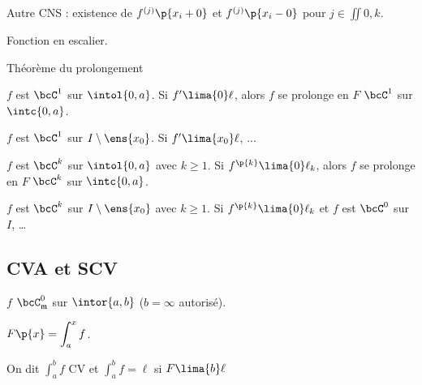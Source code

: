 \documentclass[a4paper,french,bookmarks]{book}
\begin{document}
    Autre CNS : existence de $f^{(j)}\p{x_i + 0}$ et $f^{(j)}\p{x_i - 0}$ pour $j \in \iint{0, k}$.
    
    \begin{example}{}{}
        Fonction en escalier.
    \end{example}
    
    \begin{theorem}{Théorème du prolongement}{}
        \begin{psse}
            \item $f$ est $\bcC^1$ sur $\intol{0, a}$. Si $f' \lima{0} \ell$, alors $f$ se prolonge en $F$ $\bcC^1$ sur $\intc{0, a}$.
            
            \item $f$ est $\bcC^1$ sur $I \setminus \ens{x_0}$. Si $f' \lima{x_0} \ell$, ...
            
            \item $f$ est $\bcC^k$ sur $\intol{0, a}$ avec $k \geq 1$. Si $f^{\p{k}} \lima{0} \ell_k$, alors $f$ se prolonge en $F$ $\bcC^k$ sur $\intc{0, a}$.
            
            \item $f$ est $\bcC^k$ sur $I \setminus \ens{x_0}$ avec $k \geq 1$. Si $f^{\p{k}} \lima{0} \ell_k$ et $f$ est $\bcC^0$ sur $I$, \dots
        \end{psse}
    \end{theorem}
    
    \subsection{CVA et SCV}
    
    $f$ $\bcC^0_{\mathfrak{m}}$ sur $\intor{a, b}$ ($b = \infty$ autorisé).
    
    $F\p{x} = \displaystyle\int_a^x f$.
    
    On dit $\displaystyle \int_a^b f$ CV et $\displaystyle \int_a^b f = \ell$ si $F \lima{b} \ell$
    
\end{document}

